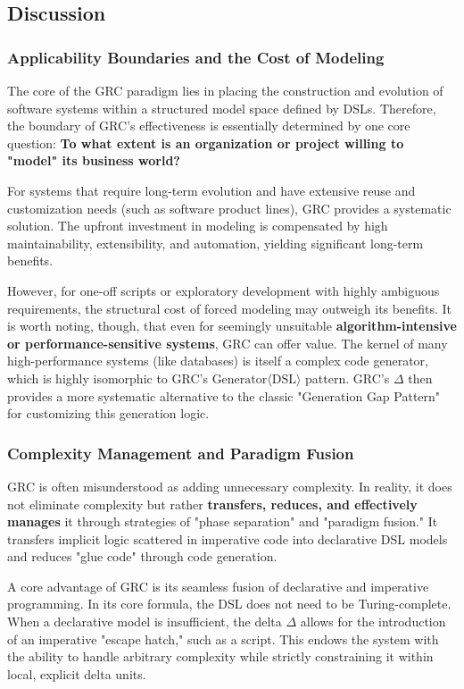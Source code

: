 \documentclass[11pt]{article}
\begin{document}
\subsection{Discussion}

\subsubsection{Applicability Boundaries and the Cost of Modeling}

The core of the GRC paradigm lies in placing the construction and evolution of software systems within a structured model space defined by DSLs. Therefore, the boundary of GRC's effectiveness is essentially determined by one core question: \textbf{To what extent is an organization or project willing to "model" its business world?}

For systems that require long-term evolution and have extensive reuse and customization needs (such as software product lines), GRC provides a systematic solution. The upfront investment in modeling is compensated by high maintainability, extensibility, and automation, yielding significant long-term benefits.

However, for one-off scripts or exploratory development with highly ambiguous requirements, the structural cost of forced modeling may outweigh its benefits. It is worth noting, though, that even for seemingly unsuitable \textbf{algorithm-intensive or performance-sensitive systems}, GRC can offer value. The kernel of many high-performance systems (like databases) is itself a complex code generator, which is highly isomorphic to GRC's $\text{Generator}\langle\text{DSL}\rangle$ pattern. GRC's $\Delta$ then provides a more systematic alternative to the classic "Generation Gap Pattern" for customizing this generation logic.

\subsubsection{Complexity Management and Paradigm Fusion}

GRC is often misunderstood as adding unnecessary complexity. In reality, it does not eliminate complexity but rather \textbf{transfers, reduces, and effectively manages} it through strategies of "phase separation" and "paradigm fusion." It transfers implicit logic scattered in imperative code into declarative DSL models and reduces "glue code" through code generation.

A core advantage of GRC is its seamless fusion of declarative and imperative programming. In its core formula, the DSL does not need to be Turing-complete. When a declarative model is insufficient, the delta $\Delta$ allows for the introduction of an imperative "escape hatch," such as a script. This endows the system with the ability to handle arbitrary complexity while strictly constraining it within local, explicit delta units.
\end{document}
